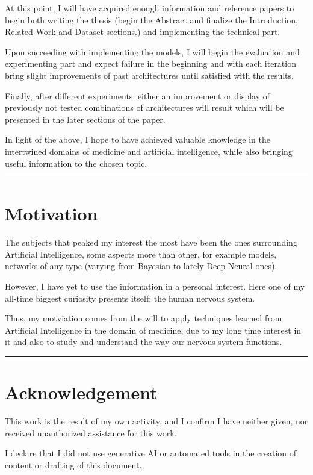 \documentclass[a4paper]{article} %
\begin{document}
At this point, I will have acquired enough information and reference papers to begin both writing the thesis (begin the
Abstract and finalize the Introduction, Related Work and Dataset sections.) and implementing the technical part.

Upon succeeding with implementing the models, I will begin the evaluation and experimenting part and expect failure in
the beginning and with each iteration bring slight improvements of past architectures until satisfied with the results.

Finally, after different experiments, either an improvement or display of previously not tested combinations of
architectures will result which will be presented in the later sections of the paper.

In light of the above, I hope to have achieved valuable knowledge in the intertwined domains of medicine and artificial intelligence,
while also bringing useful information to the chosen topic.

\vspace{14pt}
\hrule
\section{Motivation}
The subjects that peaked my interest the most have been the ones surrounding Artificial Intelligence,
some aspects more than other, for example models, networks of any type (varying from Bayesian to lately Deep Neural ones).

However, I have yet to use the information in a personal interest.
Here one of my all-time biggest curiosity presents itself: the human nervous system.

Thus, my motviation comes from the will to apply techniques learned from Artificial Intelligence in the domain of medicine,
due to my long time interest in it and also to study and understand the way our nervous system functions.

\vspace{14pt}
\hrule
\section{Acknowledgement}

This work is the result of my own activity, and I confirm I have neither given, nor received unauthorized assistance for this work.

I declare that I did not use generative AI or automated tools in the creation of content or drafting of this document.
\end{document}
